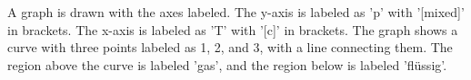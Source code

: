 A graph is drawn with the axes labeled. The y-axis is labeled as 'p' with '[mixed]' in brackets. The x-axis is labeled as 'T' with '[c]' in brackets. The graph shows a curve with three points labeled as 1, 2, and 3, with a line connecting them. The region above the curve is labeled 'gas', and the region below is labeled 'flüssig'.